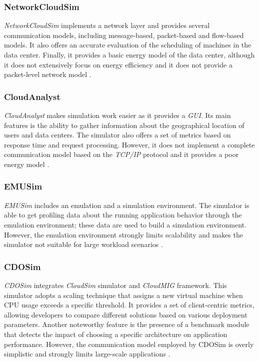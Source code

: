 {\subsubsection{NetworkCloudSim}
\emph{NetworkCloudSim} \cite{garg2011networkcloudsim} implements a network layer and  provides several communication models, including message-based, packet-based and flow-based models. It also offers an accurate evaluation of the scheduling of machines in the data center. Finally, it provides a basic energy model of the data center, although it does not extensively focus on energy efficiency and it does not provide a packet-level network model \cite{mansouri2020cloud} \cite{patel2016comprehensive}.
\subsubsection*{CloudAnalyst}
\emph{CloudAnalyst} \cite{wickremasinghe2010cloudanalyst} makes simulation work easier as it provides a \emph{GUI}. Its main features is the ability to gather information about the geographical location of users and data centers. The simulator also offers a set of metrics based on response time and request processing. However, it does not implement a complete communication model based on the \emph{TCP/IP} protocol and it provides a poor energy model \cite{mansouri2020cloud}. 
\subsubsection{EMUSim}
\emph{EMUSim} \cite{calheiros2013emusim} includes an emulation and a simulation environment. The simulator is able to get profiling data about the running application behavior through the emulation environment; these data are used to build a simulation environment. However, the emulation environment strongly limits scalability and makes the simulator not suitable for large workload scenarios \cite{mansouri2020cloud}. 
\subsubsection*{CDOSim}
\emph{CDOSim} \cite{fittkau2012cdosim} integrates \emph{CloudSim} simulator and \emph{CloudMIG} framework. This simulator adopts a scaling technique that assigns a new virtual machine when CPU usage exceeds a specific threshold.  It provides a set of client-centric metrics, allowing developers to compare different solutions based on various deployment parameters. Another noteworthy feature is the presence of a benchmark module that detects the impact of choosing a specific architecture on application performance. However, the communication model employed by CDOSim is overly simplistic and strongly limits large-scale applications \cite{mansouri2020cloud}.
}
